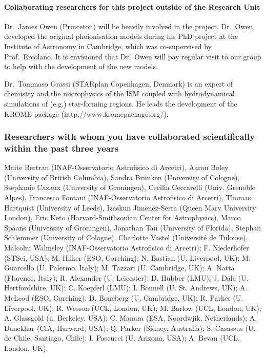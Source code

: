 \documentclass[10pt,fleqn,twoside]{article}
\begin{document}
\paragraph{Collaborating researchers for this project outside of
  the Research Unit}
Dr.\ James Owen (Princeton) will be heavily involved in the
project. Dr.\ Owen developed the original
phoionisation models during his PhD project at the Institute of
Astronomy in Cambridge, which was co-supervised by
Prof.\ Ercolano. It is envisioned that Dr.\ Owen will pay regular visit
to our group to help with the development of the new models. 

Dr.\ Tommaso Grassi (STARplan Copenhagen, Denmark) is an expert of
chemistry and the microphysics of the ISM coupled with hydrodynamical
simulations of (e.g.) star-forming regions. He leads the development of the
KROME package (http://www.kromepackage.org/).  

\subsubsection{Researchers with whom you have collaborated scientifically within the past three years}

Maite Bertran (INAF-Osservatorio Astrofisico di Arcetri), Aaron Boley (University of British Columbia), Sandra Brünken (University of Cologne), Stephanie Cazaux (University of Groningen), Cecilia Ceccarelli (Univ. Grenoble Alpes), Francesco Fontani (INAF-Osservatorio Astrofisico di Arcetri), Thomas Hartquist (University of Leeds), Izaskun Jimenez-Serra (Queen Mary University London), Eric Keto (Harvard-Smithsonian Center for Astrophysics), Marco Spaans (University of Groningen), Jonathan Tan (University of Florida), Stephan Schlemmer (University of Cologne), Charlotte Vastel (Université de Tulouse), Malcolm Walmsley (INAF-Osservatorio Astrofisico di Arcetri);
F. Niederhofer (STSci, USA); M. Hilker (ESO, Garching); N. Bastian (U. Liverpool,
UK); M. Guarcello (U. Palermo, Italy); M. Tazzari (U. Cambridge, UK);
A. Natta (Florence, Italy); R. Alexander (U. Leicester); D. Hubber
(LMU); J. Dale (U. Hertfordshire, UK); C. Koepferl (LMU); I. Bonnell
(U. St. Andrews, UK); A. McLeod (ESO, Garching); D. Boneberg
(U. Cambridge, UK); R. Parker (U. Liverpool, UK); R. Wesson (UCL,
London, UK); M. Barlow (UCL, London, UK); A. Glassgold (u. Berkeley,
USA); C. Manara (ESA, Noordwjik, Netherlands); A. Danekhar (CfA,
Harward, USA); Q. Parker (Sidney, Australia); S. Casassus
(U. de Chile, Santiago, Chile); I. Pascucci (U. Arizona, USA);
A. Bevan (UCL, London, UK).
\end{document}
